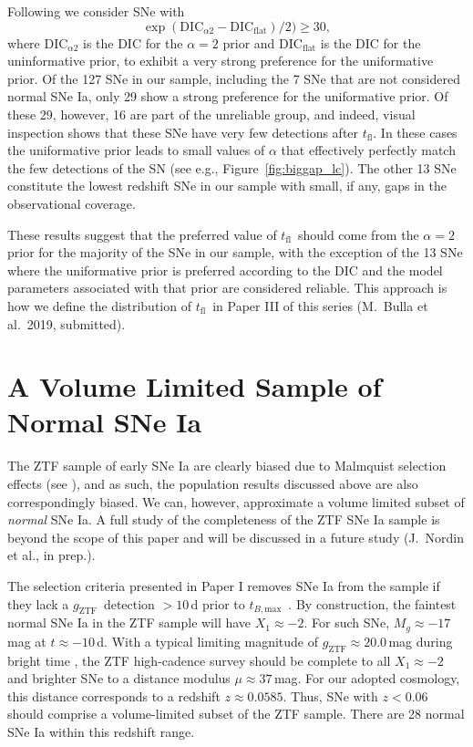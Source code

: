 \documentclass[twocolumn]{./aastex63}
\newcommand{\gztf}{$g_\mathrm{ZTF}$}
\newcommand{\tfl}{$t_\mathrm{fl}$}
\newcommand{\tbmax}{$t_{B,\mathrm{max}}$}
\begin{document}
Following \citet{Jeffreys61} we consider SNe with
%
$$\exp(\mathrm{DIC}_{\alpha2} - \mathrm{DIC}_\mathrm{flat})/2) \ge 30,$$
%
where $\mathrm{DIC}_{\alpha2}$ is the DIC for the $\alpha = 2$ prior and
$\mathrm{DIC}_\mathrm{flat}$ is the DIC for the uninformative prior, to
exhibit a very strong preference for the uniformative prior. Of the 127 SNe in
our sample, including the 7 SNe that are not considered normal SNe Ia, only 29
show a strong preference for the uniformative prior. Of these 29, however, 16
are part of the unreliable group, and indeed, visual inspection shows that
these SNe have very few detections after \tfl. In these cases the uniformative
prior leads to small values of $\alpha$ that effectively perfectly match the
few detections of the SN (see e.g., Figure~\ref{fig:biggap_lc}). The other 13
SNe constitute the lowest redshift SNe in our sample with small, if any, gaps
in the observational coverage.

These results suggest that the preferred value of \tfl\ should come from the
$\alpha = 2$ prior for the majority of the SNe in our sample, with the
exception of the 13 SNe where the uniformative prior is preferred according to
the DIC and the model parameters associated with that prior are considered
reliable. This approach is how we define the distribution of \tfl\ in Paper
III of this series (M.~Bulla et al.~2019, submitted).

\section{A Volume Limited Sample of Normal SNe Ia}\label{sec:volume_limited}

The ZTF sample of early SNe Ia are clearly biased due to Malmquist selection
effects (see \citealt{Yao19}), and as such, the population results discussed
above are also correspondingly biased. We can, however, approximate a volume
limited subset of \textit{normal} SNe Ia. A full study of the completeness of
the ZTF SNe Ia sample is beyond the scope of this paper and will be discussed
in a future study (J.~Nordin et al., in prep.).

The selection criteria presented in Paper I removes SNe Ia from the sample if
they lack a \gztf\ detection $> 10$\,d prior to \tbmax\ \citep{Yao19}. By
construction, the faintest normal SNe Ia in the ZTF sample will have $X_1
\approx -2$. For such SNe, $M_g \approx -17$\,mag at $t \approx -10$\,d. With a
typical limiting magnitude of \gztf$ \approx 20.0$\,mag during bright time
\citep{Bellm19}, the ZTF high-cadence survey should be complete to all $X_1
\approx -2$ and brighter SNe to a distance modulus $\mu \approx 37$\,mag. For
our adopted cosmology, this distance corresponds to a redshift $z \approx
0.0585$. Thus, SNe with $z < 0.06$ should comprise a volume-limited subset of
the ZTF sample. There are 28 normal SNe Ia within this redshift range.
\end{document}
